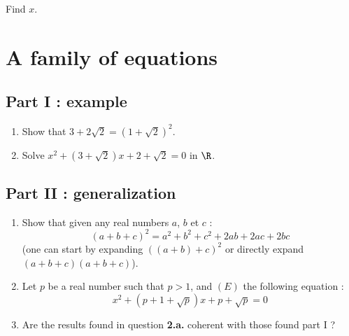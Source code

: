 \documentclass[12pt,a4paper,article,english,firamath]{nsi}
\begin{document}
Find $x$.
\newpage
\section*{A family of equations}
\subsection*{Part I : example}
\begin{enumerate}
    \item 	Show that $3+2\sqrt{2}=\left(1+\sqrt{2}\right)^2$.
    \item 	Solve $x^2+\left(3+\sqrt{2}\right)x+2+\sqrt{2}=0$ in $\R$.
\end{enumerate}
\subsection*{Part II : generalization}
\begin{enumerate}
    \item 	Show that given any real numbers $a$, $b$ et $c$ :
            $$\left(a+b+c\right)^2=a^2+b^2+c^2+2ab+2ac+2bc$$
            (one can start by expanding $\left(\left(a+b\right)+c\right)^2$ or directly expand  $\left(a+b+c\right)\left(a+b+c\right)$).
    \item 	Let $p$ be a real number such that $p>1$, and $(E)$ the following equation :
            $$x^2+\left(p+1+\sqrt{p}\right)x+p+\sqrt{p}=0$$
    \item 	Are the results found in question \textbf{2.a.} coherent with those found part I ?
\end{enumerate}
\end{document}
